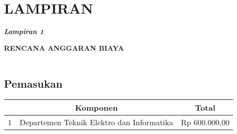 \appendix
\chapter*{LAMPIRAN}
\setcounter{section}{0} %
\renewcommand{\thesection}{\Alph{section}}
\renewcommand{\thesubsection}{\arabic{subsection}}
\setcounter{page}{1}

\textbf{\textit{Lampiran 1}}\\

\begin{center}
        \textbf{\MakeUppercase{\large{rencana anggaran biaya}}}\\
        \textbf{\MakeUppercase{\normalsize{\judulproyek}}}\\
\end{center}

\section{Pemasukan}
\begin{table}[H]
	\centering
	\label{Harga Komponen}
	\begin{tabularx}{\linewidth}{
			|p{}%
			|p{} %
			|p{}|%
		}
		\hline
		\rowcolor{blue!20} %
		\multicolumn{1}{|c|}{\textbf{No.}} & 
		\multicolumn{1}{|c|}{\textbf{Komponen}} &
		\multicolumn{1}{c|}{\textbf{Total}}\\ \hline
		1 & Departemen Teknik Elektro dan Informatika & Rp 600.000,00 \\ \hline
		
	\end{tabularx}
\end{table}

